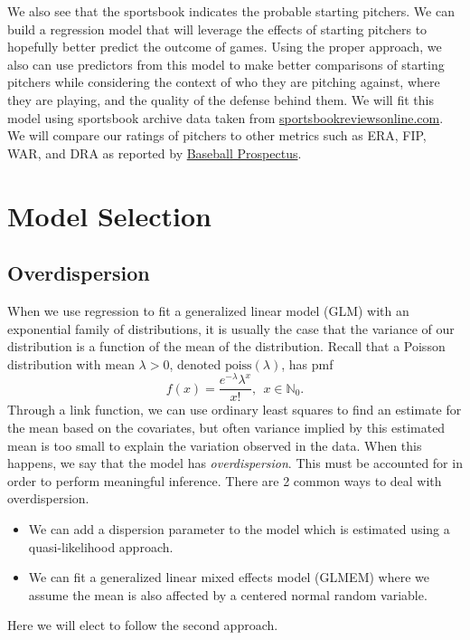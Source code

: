 \documentclass [52pt] {article}
\newcommand{\N}{\mathbb{N}}
\begin{document}
We also see that the sportsbook indicates the probable starting pitchers.  We can build a regression model that will leverage the effects of starting pitchers to hopefully better predict the outcome of games.  Using the proper approach, we also can use predictors from this model to make better comparisons of starting pitchers while considering the context of who they are pitching against, where they are playing, and the quality of the defense behind them.  We will fit this model using sportsbook archive data  taken from \href{https://www.sportsbookreviewsonline.com/scoresoddsarchives/mlb/mlboddsarchives.htm}{sportsbookreviewsonline.com}.  We will compare our ratings of pitchers to other metrics such as ERA, FIP, WAR, and DRA as reported by \href{https://www.baseballprospectus.com/leaderboards/pitching/}{Baseball Prospectus}.

\section{Model Selection}

\subsection{Overdispersion}

When we use regression to fit a generalized linear model (GLM) with an exponential family of distributions, it is usually the case that the variance of our distribution is a function of the mean of the distribution.  Recall that a Poisson distribution with mean $\lambda>0$, denoted $\text{poiss}(\lambda)$, has pmf
\[f(x) = \frac{e^{-\lambda}\lambda^x}{x!},\:\:x\in\N_0.\]
Through a link function, we can use ordinary least squares to find an estimate for the mean based on the covariates, but often variance implied by this estimated mean is too small to explain the variation observed in the data.  When this happens, we say that the model has \emph{overdispersion}.  This must be accounted for in order to perform meaningful inference.  There are 2 common ways to deal with overdispersion.
\begin{itemize}
\item We can add a dispersion parameter to the model which is estimated using a quasi-likelihood approach.
\item We can fit a generalized linear mixed effects model (GLMEM) where we assume the mean is also affected by a centered normal random variable. 
\end{itemize}
Here we will elect to follow the second approach.
\end{document}
